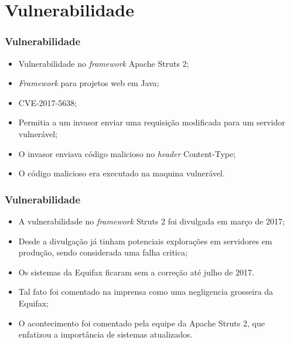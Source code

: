 \documentclass{beamer}
\begin{document}
	\section{Vulnerabilidade}
	\begin{frame}
		\frametitle{Vulnerabilidade}
		\begin{itemize}
			\item Vulnerabilidade no \textit{framework} Apache Struts 2;
			\item \textit{Framework} para projetos web em Java;
			\item CVE-2017-5638;
			\item Permitia a um invasor enviar uma requisição modificada para um servidor vulnerável;
			\item O invasor enviava código malicioso no \textit{header} Content-Type;
			\item O código malicioso era executado na maquina vulnerável.
		\end{itemize}
	\end{frame}
	\begin{frame}
		\frametitle{Vulnerabilidade}
		\begin{itemize}
			\item A vulnerabilidade no \textit{framework} Struts 2 foi divulgada em março de 2017;
			\item Desde a divulgação já tinham potenciais explorações em servidores em produção, sendo considerada uma falha critica;
			\item Os sistemas da Equifax ficaram sem a correção até julho de 2017.
			\item Tal fato foi comentado na imprensa como uma negligencia grosseira da Equifax;
			\item O acontecimento foi comentado pela equipe da Apache Struts 2, que enfatizou a importância de sistemas atualizados.
		\end{itemize}
	\end{frame}
\end{document}
